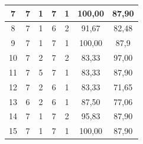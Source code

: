 \begin{table}[H]
\begin{tabular}{|ccccc|c|c|}
		\multicolumn{1}{|c|}{7}                                 & \multicolumn{1}{c|}{7}                               & \multicolumn{1}{c|}{1}                               & \multicolumn{1}{c|}{7}                               & 1       & 100,00    & 87,90          \\ \hline
		\multicolumn{1}{|c|}{8}                                 & \multicolumn{1}{c|}{7}                               & \multicolumn{1}{c|}{1}                               & \multicolumn{1}{c|}{6}                               & 2       & 91,67     & 82,48          \\ \hline
		\multicolumn{1}{|c|}{9}                                 & \multicolumn{1}{c|}{7}                               & \multicolumn{1}{c|}{1}                               & \multicolumn{1}{c|}{7}                               & 1       & 100,00    & 87,9           \\ \hline
		\multicolumn{1}{|c|}{10}                                & \multicolumn{1}{c|}{7}                               & \multicolumn{1}{c|}{2}                               & \multicolumn{1}{c|}{7}                               & 2       & 83,33     & 97,00          \\ \hline
		\multicolumn{1}{|c|}{11}                                & \multicolumn{1}{c|}{7}                               & \multicolumn{1}{c|}{5}                               & \multicolumn{1}{c|}{7}                               & 1       & 83,33     & 87,90          \\ \hline
		\multicolumn{1}{|c|}{12}                                & \multicolumn{1}{c|}{7}                               & \multicolumn{1}{c|}{2}                               & \multicolumn{1}{c|}{6}                               & 1       & 83,33     & 71,65          \\ \hline
		\multicolumn{1}{|c|}{13}                                & \multicolumn{1}{c|}{6}                               & \multicolumn{1}{c|}{2}                               & \multicolumn{1}{c|}{6}                               & 1       & 87,50     & 77,06          \\ \hline
		\multicolumn{1}{|c|}{14}                                & \multicolumn{1}{c|}{7}                               & \multicolumn{1}{c|}{1}                               & \multicolumn{1}{c|}{7}                               & 2       & 95,83     & 87,90          \\ \hline
		\multicolumn{1}{|c|}{15}                                & \multicolumn{1}{c|}{7}                               & \multicolumn{1}{c|}{1}                               & \multicolumn{1}{c|}{7}                               & 1       & 100,00    & 87,90          \\ \hline

\end{tabular}
\end{table}
